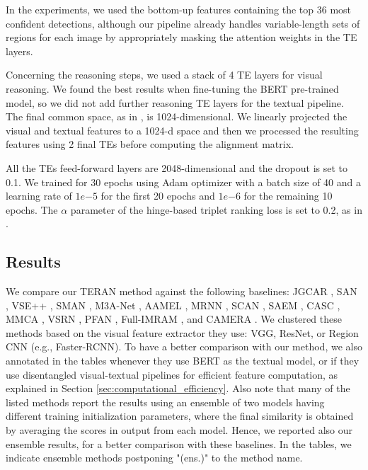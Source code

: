 \documentclass[acmsmall]{acmart}
\newcommand{\majorrevised}[1]{#1}
\begin{document}
In the experiments, we used the bottom-up features containing the top 36 most confident detections, although our pipeline already handles variable-length sets of regions for each image by appropriately masking the attention weights in the TE layers.

Concerning the reasoning steps, we used a stack of 4 TE layers for visual reasoning. We found the best results when fine-tuning the BERT pre-trained model, so we did not add further reasoning TE layers for the textual pipeline.
The final common space, as in \cite{vsepp2018faghri}, is 1024-dimensional. We linearly projected the visual and textual features to a 1024-d space and then we processed the resulting features using 2 final TEs before computing the alignment matrix.


All the TEs feed-forward layers are 2048-dimensional and the dropout is set to 0.1.
We trained for 30 epochs using Adam optimizer with a batch size of 40 and a learning rate of $1e{-5}$ for the first 20 epochs and $1e{-6}$ for the remaining 10 epochs.
The $\alpha$ parameter of the hinge-based triplet ranking loss is set to 0.2, as in \cite{vsepp2018faghri,li2019}.



\subsection{Results}
\majorrevised{We compare our TERAN method against the following baselines: JGCAR \cite{wang2018joint}, SAN \cite{ji2019saliency}, VSE++ \cite{vsepp2018faghri}, SMAN \cite{ji2020sman}, M3A-Net \cite{ji2020multi}, AAMEL \cite{wei2020adversarial}, MRNN \cite{karpathy2015alignment}, SCAN \cite{lee2018stackedcrossattention}, SAEM \cite{wu2019learning}, CASC \cite{xu2020cross}, MMCA \cite{wei2020multi}, VSRN \cite{li2019}, PFAN \cite{wang2019position}, Full-IMRAM \cite{Chen2020imram}, and CAMERA \cite{qu2020context}.
We clustered these methods based on the visual feature extractor they use: VGG, ResNet, or Region CNN (e.g., Faster-RCNN). To have a better comparison with our method, we also annotated in the tables whenever they use BERT as the textual model, or if they use disentangled visual-textual pipelines for efficient feature computation, as explained in Section \ref{sec:computational_efficiency}.
Also note that many of the listed methods report the results using an ensemble of two models having different training initialization parameters, where the final similarity is obtained by averaging the scores in output from each model. Hence, we reported also our ensemble results, for a better comparison with these baselines. In the tables, we indicate ensemble methods postponing "(ens.)" to the method name.
}
\end{document}
